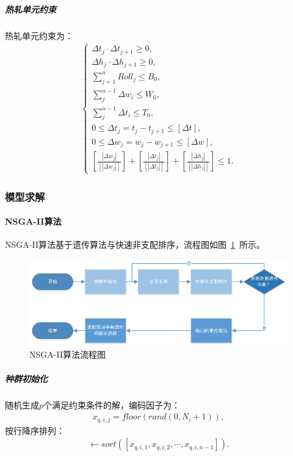 \documentclass{whutmod}
\begin{document}
\subparagraph{热轧单元约束}
热轧单元约束为：
\begin{gather}
\left\{\begin{matrix}
\Delta t_j\cdot \Delta t_{j+1}\geq 0,
\\\Delta h_j\cdot \Delta h_{j+1}\geq 0, 
\\\textstyle \sum_{j=1}^{n}Roll_{j}\leq B_0,
\\ \textstyle\sum_{j}^{n-1}\Delta w_i\leq W_0,
\\\textstyle\sum_{j}^{n-1}\Delta t_i\leq T_0,  
\\0\leq\Delta t_j=t_{j}-t_{j+1}\leq [\Delta t],
\\0\leq\Delta w_j=w_{j}-w_{j+1}\leq [\Delta w],
\\ [\frac{|\Delta w_j|}{[|\Delta w_j|]}]+[\frac{|\Delta t_j|}{[|\Delta t_j|]}]+[\frac{|\Delta h_j|}{[|\Delta h_j|]}]\leq 1.
\end{matrix}\right.
\end{gather}

\subsubsection{模型求解}
\paragraph{NSGA-II算法}
NSGA-II算法基于遗传算法与快速非支配排序，流程图如图~\ref{111sad1sssss11}~所示。
\begin{figure}[H]
\centering
\includegraphics[width=\textwidth]{figures/liuz.png}
\caption{NSGA-II算法流程图}\label{111sad1sssss11}
\end{figure}

\subparagraph{种群初始化}
随机生成$p$个满足约束条件的解，编码因子为：
\begin{gather*}
x_{q,i,j}=floor(rand(0,N_i+1)),
\end{gather*}
按行降序排列：
\begin{gather*}
[x_{q,i,1},x_{q,i,2},\cdots,x_{q,i,n-1}]\leftarrow sort([x_{q,i,1},x_{q,i,2},\cdots,x_{q,i,n-1}]).
\end{gather*}
\end{document}
